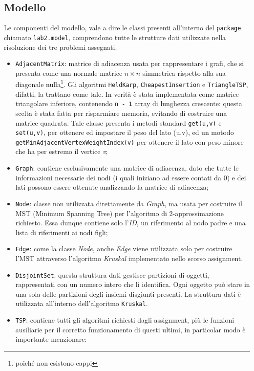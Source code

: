 \subsection{Modello}
Le componenti del modello, vale a dire le classi presenti all'interno del \texttt{package} chiamato \texttt{lab2.model}, comprendono tutte le strutture dati utilizzate nella risoluzione dei tre problemi assegnati. 
\begin{itemize}
	\item \label{adjmat}\texttt{AdjacentMatrix}: matrice di adiacenza usata per rappresentare i grafi, che si presenta come una normale matrice $n\times n$ simmetrica rispetto alla sua diagonale nulla\footnote{poiché non esistono cappi}. Gli algoritmi \texttt{HeldKarp}, \texttt{CheapestInsertion} e \texttt{TriangleTSP}, difatti, la trattano come tale. In verità è stata implementata come matrice triangolare inferiore, contenendo \texttt{n - 1} array di lunghezza crescente: questa scelta è stata fatta per risparmiare memoria, evitando di costruire una matrice quadrata. Tale classe presenta i metodi standard \texttt{get(u,v)} e \texttt{set(u,v)}, per ottenere ed impostare il peso del lato (u,v), ed un motodo \texttt{getMinAdjacentVertexWeightIndex(v)} per ottenere il lato con peso minore che ha per estremo il vertice \textit{v};
	\item \texttt{Graph}: contiene esclusivamente una matrice di adiacenza, dato che tutte le informazioni necessarie dei nodi (i quali iniziano ad essere contati da 0) e dei lati possono essere ottenute analizzando la matrice di adiacenza;
	\item \texttt{Node}: classe non utilizzata direttamente da \textit{Graph}, ma usata per costruire il MST (Minimum Spanning Tree) per l'algoritmo di 2-approssimazione richiesto. Essa dunque contiene solo l'\textit{ID}, un riferimento al nodo padre e una lista di riferimenti ai nodi figli;
	\item \texttt{Edge}: come la classe \textit{Node}, anche \textit{Edge} viene utilizzata solo per costruire l'MST attraverso l'algoritmo \textit{Kruskal} implementato nello scorso assignment.
	\item \texttt{DisjointSet}: questa struttura dati gestisce partizioni di oggetti, rappresentati con un numero intero che li identifica. Ogni oggetto può stare in una sola delle partizioni degli insiemi disgiunti presenti. La struttura dati è utilizzata all'interno dell'algoritmo \texttt{Kruskal}.
	\item \texttt{TSP}: contiene tutti gli algoritmi richiesti dagli assignment, più le funzioni ausiliarie per il corretto funzionamento di questi ultimi, in particolar modo è importante menzionare:

\end{itemize}
